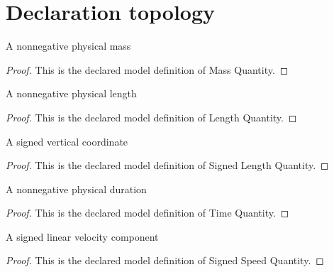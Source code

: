 \section{Declaration topology}
\begin{definition}
  \label{def:physics:phyx-mini-0706:phyxminiproblems-problemphyxmini0706-massquantity}
  A nonnegative physical mass
\end{definition}
\begin{proof}
  This is the declared model definition of Mass Quantity.
\end{proof}
\begin{definition}
  \label{def:physics:phyx-mini-0706:phyxminiproblems-problemphyxmini0706-lengthquantity}
  A nonnegative physical length
\end{definition}
\begin{proof}
  This is the declared model definition of Length Quantity.
\end{proof}
\begin{definition}
  \label{def:physics:phyx-mini-0706:phyxminiproblems-problemphyxmini0706-signedlengthquantity}
  A signed vertical coordinate
\end{definition}
\begin{proof}
  This is the declared model definition of Signed Length Quantity.
\end{proof}
\begin{definition}
  \label{def:physics:phyx-mini-0706:phyxminiproblems-problemphyxmini0706-timequantity}
  A nonnegative physical duration
\end{definition}
\begin{proof}
  This is the declared model definition of Time Quantity.
\end{proof}
\begin{definition}
  \label{def:physics:phyx-mini-0706:phyxminiproblems-problemphyxmini0706-signedspeedquantity}
  A signed linear velocity component
\end{definition}
\begin{proof}
  This is the declared model definition of Signed Speed Quantity.
\end{proof}
